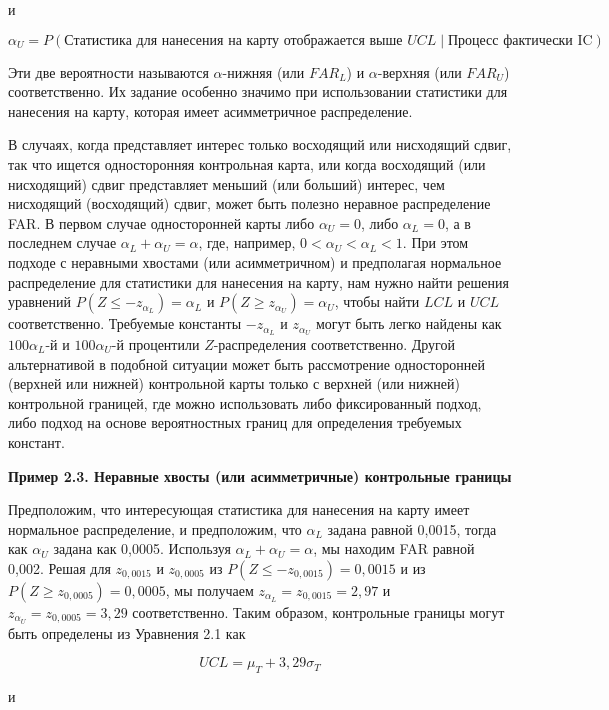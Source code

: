 и

\[
\alpha_U = P(\text{Статистика для нанесения на карту отображается выше } UCL \mid \text{Процесс фактически IC}).
\]

Эти две вероятности называются \(\alpha\)-нижняя (или \(FAR_L\)) и \(\alpha\)-верхняя (или \(FAR_U\)) соответственно. Их задание особенно значимо при использовании статистики для нанесения на карту, которая имеет асимметричное распределение.

В случаях, когда представляет интерес только восходящий или нисходящий сдвиг, так что ищется односторонняя контрольная карта, или когда восходящий (или нисходящий) сдвиг представляет меньший (или больший) интерес, чем нисходящий (восходящий) сдвиг, может быть полезно неравное распределение FAR. В первом случае односторонней карты либо \(\alpha_U = 0\), либо \(\alpha_L = 0\), а в последнем случае \(\alpha_L + \alpha_U = \alpha\), где, например, \(0 < \alpha_U < \alpha_L < 1\). При этом подходе с неравными хвостами (или асимметричном) и предполагая нормальное распределение для статистики для нанесения на карту, нам нужно найти решения уравнений \(P(Z \leq -z_{\alpha_L}) = \alpha_L\) и \(P(Z \geq z_{\alpha_U}) = \alpha_U\), чтобы найти \(LCL\) и \(UCL\) соответственно. Требуемые константы \(-z_{\alpha_L}\) и \(z_{\alpha_U}\) могут быть легко найдены как \(100\alpha_L\)-й и \(100\alpha_U\)-й процентили \(Z\)-распределения соответственно. Другой альтернативой в подобной ситуации может быть рассмотрение односторонней (верхней или нижней) контрольной карты только с верхней (или нижней) контрольной границей, где можно использовать либо фиксированный подход, либо подход на основе вероятностных границ для определения требуемых констант.

\noindent\textbf{Пример 2.3. Неравные хвосты (или асимметричные) контрольные границы}

Предположим, что интересующая статистика для нанесения на карту имеет нормальное распределение, и предположим, что \(\alpha_L\) задана равной 0,0015, тогда как \(\alpha_U\) задана как 0,0005. Используя \(\alpha_L + \alpha_U = \alpha\), мы находим FAR равной 0,002. Решая для \(z_{0,0015}\) и \(z_{0,0005}\) из \(P(Z \leq -z_{0,0015}) = 0,0015\) и из \(P(Z \geq z_{0,0005}) = 0,0005\), мы получаем \(z_{\alpha_L} = z_{0,0015} = 2,97\) и \(z_{\alpha_U} = z_{0,0005} = 3,29\) соответственно. Таким образом, контрольные границы могут быть определены из Уравнения 2.1 как

\[
UCL = \mu_T + 3,29\sigma_T
\]

и

